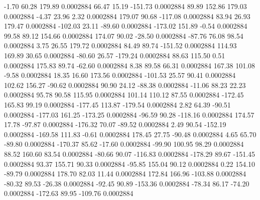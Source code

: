        -1.70       60.28      179.89     0.0002884
       66.47       15.19     -151.73     0.0002884
       89.89      152.86      179.03     0.0002884
       -4.37       23.96        2.32     0.0002884
      179.07       90.68     -117.08     0.0002884
       83.94       26.93      179.47     0.0002884
     -102.03       23.11      -89.60     0.0002884
     -173.02      151.89       -0.54     0.0002884
       99.58       89.12      154.66     0.0002884
      174.07       90.02      -28.50     0.0002884
      -87.76       76.08       98.54     0.0002884
        3.75       26.55      179.72     0.0002884
       84.49       89.74     -151.52     0.0002884
      114.93      169.89       30.65     0.0002884
      -80.60       26.57     -179.24     0.0002884
       88.63      115.50        0.51     0.0002884
      175.83       89.74      -62.60     0.0002884
        8.38       89.58       66.31     0.0002884
      167.38      101.08       -9.58     0.0002884
       18.35       16.60      173.56     0.0002884
     -101.53       25.57       90.41     0.0002884
      102.62      156.27      -90.62     0.0002884
       90.90       24.12      -88.38     0.0002884
      -11.06       88.23       22.23     0.0002884
       95.78       90.58      115.95     0.0002884
      101.14      110.12       87.55     0.0002884
     -172.45      165.83       99.19     0.0002884
     -177.45      113.87     -179.54     0.0002884
        2.82       64.39      -90.51     0.0002884
     -177.03      161.25     -173.25     0.0002884
      -96.59       90.28     -118.16     0.0002884
      174.57       17.78      -97.87     0.0002884
     -176.32       70.07      -89.52     0.0002884
        2.49       90.54     -152.19     0.0002884
     -169.58      111.83       -0.61     0.0002884
      178.45       27.75      -90.48     0.0002884
        4.65       65.70      -89.80     0.0002884
     -170.37       85.62      -17.60     0.0002884
      -99.90      100.95       98.29     0.0002884
       88.52      160.60       83.54     0.0002884
      -80.66       90.07     -116.83     0.0002884
     -178.29       89.67     -151.45     0.0002884
       93.37      155.71       90.33     0.0002884
      -95.85      155.04       90.12     0.0002884
        0.22      154.10      -89.79     0.0002884
      178.70       82.03       11.44     0.0002884
      172.84      166.96     -103.88     0.0002884
      -80.32       89.53      -26.38     0.0002884
      -92.45       90.89     -153.36     0.0002884
      -78.34       86.17      -74.20     0.0002884
     -172.63       89.95     -109.76     0.0002884
